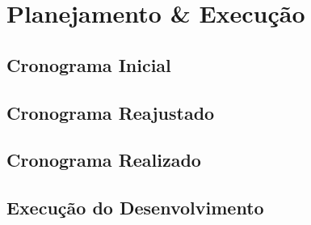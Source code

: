 \chapter[Planejamento \& Execução]{Planejamento \& Execução}
\label{chap:planejamento}
	\section[Cronograma Inicial]{Cronograma Inicial}
	\label{sec:planejamento_cronogramaInicical}
		

	\begin{landscape}
		\section[Cronograma Reajustado]{Cronograma Reajustado}
		\label{sec:planejamento_cronogramaReajustado}
			
	\end{landscape}

	\begin{landscape}
		\section[Cronograma Realizado]{Cronograma Realizado}
		\label{sec:planejamento_cronogramaRealizado}
			
	\end{landscape}

	\section[Execução do Desenvolvimento]{Execução do Desenvolvimento}
	\label{sec:planejamento_desenvolvimento}
		
